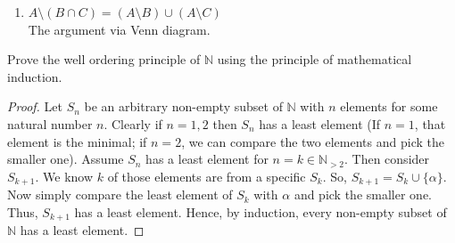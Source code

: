 \documentclass[11pt, a4paper]{article}
\begin{document}
\begin{Day}
\begin{enumerate}
\begin{proof}
    $x\in $ LHS $\implies x\in A$ and $x\notin B\cup C$ \\
    $\implies x\in A$ and $(x\notin B \text{ or } x\notin C)$ \\ 
    $\implies x\in A\setminus B \text{ and } x\in A\setminus C$ \\
    $\implies x\in (A\setminus B)\cap (A\setminus C)$ \\
    Thus, LHS $\subseteq$ RHS. \\
    Now, $x\in $ RHS $\implies x\in A\setminus B \text{ and } x\in A\setminus C$ \\
    $\implies x\in A$ and $(x\notin B \text{ or } x\notin C)$ \\
    $\implies x\in A$ and $x\notin B\cup C$ \\
    $\implies x\in A\setminus (B\cup C)$ \\
    Thus, RHS $\subseteq$ LHS. \\
    Hence, LHS = RHS.
  \end{proof}
  \item $A\setminus (B\cap C)=(A\setminus B)\cup (A\setminus C)$\\
  The argument via Venn diagram.
\end{enumerate}

\item  Prove the well ordering principle of $\mathbb{N}$ using the principle of mathematical induction.
\begin{proof}
    Let $S_n$ be an arbitrary non-empty subset of $\mathbb{N}$ with $n$ elements for some natural number $n$.
    Clearly if $n=1,2$ then $S_n$ has a least element (If $n=1$, that element is the minimal; if $n=2$, we can compare the two elements and pick the smaller one). Assume $S_n$ has a least element for $n=k\in \mathbb{N}_{>2}$. Then consider $S_{k+1}.$ We know $k$ of those elements are from a specific $S_k.$ So, $S_{k+1}=S_k\cup \{\alpha\}.$ Now simply compare the least element of $S_k$ with $\alpha$ and pick the smaller one. Thus, $S_{k+1}$ has a least element. Hence, by induction, every non-empty subset of $\mathbb{N}$ has a least element.
\end{proof}
  \item
\end{Day}
\end{document}
